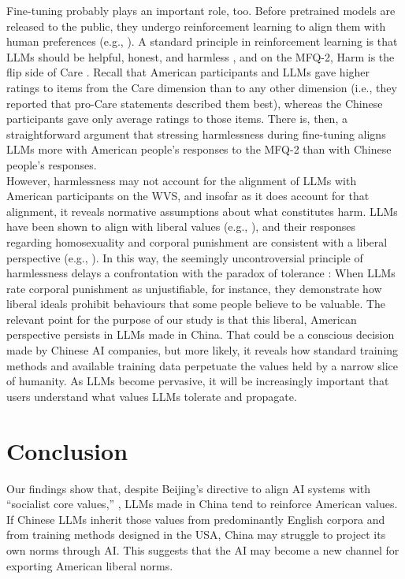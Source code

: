 \documentclass[11pt,a4paper]{article}
\begin{document}
\indent Fine-tuning probably plays an important role, too. Before pretrained models are released to the public, they undergo reinforcement learning to align them with human preferences (e.g., \citealp{bai2022training}). A standard principle in reinforcement learning is that LLMs should be helpful, honest, and harmless \cite{askell2021general}, and on the MFQ-2, Harm is the flip side of Care \cite{haidt2007morality}. Recall that American participants and LLMs gave higher ratings to items from the Care dimension than to any other dimension (i.e., they reported that pro-Care statements described them best), whereas the Chinese participants gave only average ratings to those items. There is, then, a straightforward argument that stressing harmlessness during fine-tuning aligns LLMs more with American people’s responses to the MFQ-2 than with Chinese people’s responses.\\ 
\indent However, harmlessness may not account for the alignment of LLMs with American participants on the WVS, and insofar as it does account for that alignment, it reveals normative assumptions about what constitutes harm. LLMs have been shown to align with liberal values (e.g., \citealp{hartmann2023political, motoki2024more, rozado2024political}), and their responses regarding homosexuality and corporal punishment are consistent with a liberal perspective (e.g., \citealp{graham2009liberals}). In this way, the seemingly uncontroversial principle of harmlessness delays a confrontation with the paradox of tolerance \cite{popper1945}: When LLMs rate corporal punishment as unjustifiable, for instance, they demonstrate how liberal ideals prohibit behaviours that some people believe to be valuable. The relevant point for the purpose of our study is that this liberal, American perspective persists in LLMs made in China. That could be a conscious decision made by Chinese AI companies, but more likely, it reveals how standard training methods and available training data perpetuate the values held by a narrow slice of humanity. As LLMs become pervasive, it will be increasingly important that users understand what values LLMs tolerate and propagate.

\section{Conclusion}

Our findings show that, despite Beijing’s directive to align AI systems with “socialist core values,” \cite{govcn2023}, LLMs made in China tend to reinforce American values. If Chinese LLMs inherit those values from predominantly English corpora and from training methods designed in the USA, China may struggle to project its own norms through AI. This suggests that the AI may become a new channel for exporting American liberal norms.
\end{document}

